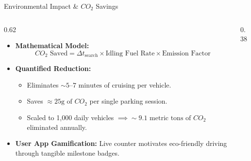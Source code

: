 \documentclass[aspectratio=169]{beamer}
\begin{document}
\begin{frame}{Environmental Impact \& $CO_2$ Savings}
    \begin{columns}
        \begin{column}{0.62\textwidth}
            \begin{itemize}
                \item \textbf{Mathematical Model:}
                \[
                    CO_2 \text{ Saved} = \Delta t_{\text{search}} \times \text{Idling Fuel Rate} \times \text{Emission Factor}
                \]
                \item \textbf{Quantified Reduction:}
                \begin{itemize}
                    \item Eliminates $\sim 5\text{--}7\text{ minutes}$ of cruising per vehicle.
                    \item Saves $\approx 25\text{g of } CO_2$ per single parking session.
                    \item Scaled to 1,000 daily vehicles $\implies \sim 9.1\text{ metric tons of } CO_2$ eliminated annually.
                \end{itemize}
                \item \textbf{User App Gamification:} Live counter motivates eco-friendly driving through tangible milestone badges.
            \end{itemize}
        \end{column}
        \begin{column}{0.38\textwidth}
            \begin{center}
            \end{center}
        \end{column}
    \end{columns}
\end{frame}
\end{document}
